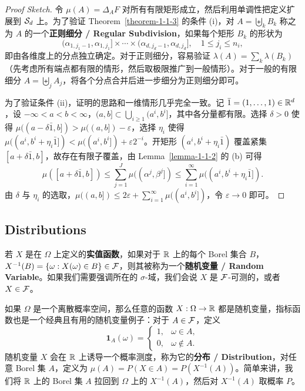 \begin{proof}[Proof Sketch]
    令 $\mu(A) = \Delta_A F$ 对所有有限矩形成立，然后利用单调性把定义扩展到 $\mathcal{S}_d$ 上。为了验证 Theorem~\ref{theorem-1-1-3} 的条件 (i)，对 $A = \biguplus_k B_k$ 称之为 $A$ 的一个{\normalfont\bfseries 正则细分 / Regular Subdivision}，如果每个矩形 $B_k$ 的形状为
    \[
        (\alpha_{1,j_1-1}, \alpha_{1,j_1}] \times \cdots \times (\alpha_{d,j_d-1}, \alpha_{d,j_d}], \quad 1 \le j_i \le n_i,
    \]
    即由各维度上的分点独立确定。对于正则细分，容易验证 $\lambda(A) = \sum_k \lambda(B_k)$（先考虑所有端点都有限的情形，然后取极限推广到一般情形）。对于一般的有限细分 $A = \biguplus_j A_j$，将各个分点合并后进一步细分为正则细分即可。

    为了验证条件 (ii)，证明的思路和一维情形几乎完全一致。记 $\bar{1} = (1,\ldots,1) \in \mathbb{R}^d$，设 $-\infty < a < b < \infty$，$(a,b] \subset \bigcup_{i \ge 1} (a^i,b^i]$，其中各分量都有限。选择 $\delta > 0$ 使得 $\mu((a-\delta\bar{1},b]) > \mu((a,b]) - \varepsilon$，选择 $\eta_i$ 使得 $\mu((a^i,b^i+\eta_i\bar{1}]) < \mu((a^i,b^i]) + \varepsilon 2^{-i}$。开矩形 $(a^i,b^i+\eta_i\bar{1})$ 覆盖紧集 $[a+\delta\bar{1},b]$，故存在有限子覆盖，由 Lemma~\ref{lemma-1-1-2} 的 (b) 可得
    \[
        \mu([a+\delta\bar{1},b]) \le \sum_{j=1}^J \mu((\alpha^j,\beta^j]) \le \sum_{i=1}^\infty \mu((a^i,b^i+\eta_i\bar{1}]).
    \]
    由 $\delta$ 与 $\eta_i$ 的选取，$\mu((a,b]) \le 2\varepsilon + \sum_{i=1}^\infty \mu((a^i,b^i])$，令 $\varepsilon \to 0$ 即可。
\end{proof}

\clearpage

\subsection{Distributions}

若 $X$ 是在 $\Omega$ 上定义的{\normalfont\bfseries 实值函数}，如果对于 $\mathbb{R}$ 上的每个 Borel 集合 $B$，$X^{-1}(B) = \{ \omega : X(\omega) \in B \} \in \mathcal{F}$，则其被称为一个{\normalfont\bfseries 随机变量 / Random Variable}。如果我们需要强调所在的 $\sigma$-域，我们会说 $X$ 是 $\mathcal{F}$-可测的，或者 $X \in \mathcal{F}$。

如果 $\Omega$ 是一个离散概率空间，那么任意的函数 $X : \Omega \to \mathbb{R}$ 都是随机变量，指标函数也是一个经典且有用的随机变量例子：对于 $A \in \mathcal{F}$，定义
\[
    \mathbf{1}_A(\omega) =
    \begin{cases}
        1, & \omega \in A,    \\
        0, & \omega \notin A.
    \end{cases}
\]
随机变量 $X$ 会在 $\mathbb{R}$ 上诱导一个概率测度，称为它的{\normalfont\bfseries 分布 / Distribution}，对任意 Borel 集 $A$，定义为 $\mu(A) = P(X \in A) = P(X^{-1}(A))$。简单来讲，我们将 $\mathbb{R}$ 上的 Borel 集 $A$ 拉回到 $\Omega$ 上的 $X^{-1}(A)$，然后对 $X^{-1}(A)$ 取概率 $P$。

